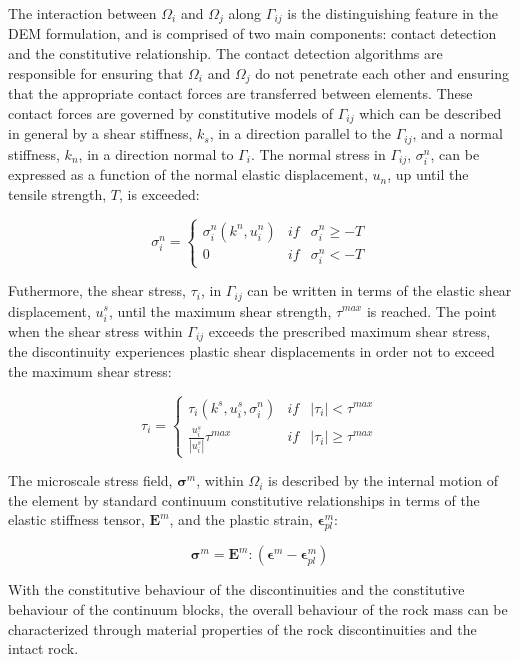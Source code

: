 
The interaction between $\Omega_i$ and $\Omega_j$ along $\Gamma_{ij}$ is the distinguishing feature in the DEM formulation, and is comprised of two main components: contact detection and the constitutive relationship. The contact detection algorithms are responsible for ensuring that $\Omega_i$ and $\Omega_j$ do not penetrate each other and ensuring that the appropriate contact forces are transferred between elements. These contact forces are governed by constitutive models of $\Gamma_{ij}$ which can be described in general by a shear stiffness, $k_s$, in a direction parallel to the $\Gamma_{ij}$, and a normal stiffness, $k_n$, in a direction normal to $\Gamma_i$. The normal stress in $\Gamma_{ij}$, $\sigma_i^n$, can be expressed as a function of the normal elastic displacement, $u_n$, up until the tensile strength, $T$, is exceeded: 

\begin{equation}
\sigma^n_i=\left\{\begin{matrix}
\sigma^n_i\left(k^n, u_i^n\right) &if& \sigma^n_i \geq -T\\ 
 0 & if &\sigma^n_i < -T
\end{matrix}\right.
\label{eqn:demnormal}
\end{equation}

Futhermore, the shear stress, $\tau_i$, in $\Gamma_{ij}$ can be written in terms of the elastic shear displacement, $u_i^s$, until the maximum shear strength, $\tau^{max}$ is reached. The point when the shear stress within $\Gamma_{ij}$ exceeds the prescribed maximum shear stress, the discontinuity experiences plastic shear displacements in order not to exceed the maximum shear stress:

\begin{equation}
\tau_i=\left\{\begin{matrix}
\tau_i\left(k^s,u_i^s, \sigma_i^n\right) &if&\left |\tau_i \right | < \tau^{max}\\ 
\frac{u_i^s}{\left|u_i^s\right|}\tau^{max} & if &\left |\tau_i \right | \geq \tau^{max}
\end{matrix}\right.
\label{eqn:demshear}
\end{equation}

The microscale stress field, $\boldsymbol{\sigma}^m$, within $\Omega_i$ is described by the internal motion of the element by standard continuum constitutive relationships in terms of the elastic stiffness tensor, $\mathbf{E}^m$, and the plastic strain, $\boldsymbol{\epsilon}^m_{pl}$:  

\begin{equation}
\boldsymbol{\sigma}^m =\mathbf{E}^m:\left(\boldsymbol{\epsilon}^m - \boldsymbol{\epsilon}^m_{pl}\right)
\label{eqn:demcont}
\end{equation}

With the constitutive behaviour of the discontinuities and the constitutive behaviour of the continuum blocks, the overall behaviour of the rock mass can be characterized through material properties of the rock discontinuities and the intact rock.